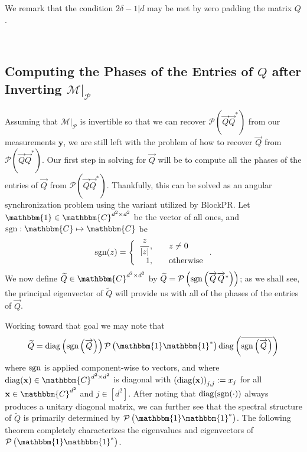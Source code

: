 \documentclass[]{spie}  %
\def \vec{\overrightarrow}
\def \x {\mathbf x}
\def \y {\mathbf y}
\def \one { \mathbbm{1}}
\def \sgn {{\rm sgn}}
\def \diag {{\rm diag}}
\begin{document}
We remark that the condition $2 \delta - 1 \vert d$ may be met by zero padding the matrix $Q$.

\

\subsection{Computing the Phases of the Entries of $Q$ after Inverting $\mathcal{M} \big|_{\mathcal{P}}$}
\label{sec:Getphases}

Assuming that $\mathcal{M} \big|_{\mathcal{P}}$ is invertible so that we can recover $\mathcal{P} ( \vec{Q} \vec{Q}^* )$ from our measurements $\y$, we are still left with the problem of how to recover $\vec{Q}$ from $\mathcal{P} ( \vec{Q} \vec{Q}^* )$.  Our first step in solving for $\vec{Q}$ will be to compute all the phases of the entries of $\vec{Q}$ from $\mathcal{P} ( \vec{Q} \vec{Q}^* )$.  Thankfully, this can be solved as an angular synchronization problem\cite{singer2011angular} using the variant utilized by BlockPR.\cite{viswanathana2015fast,iwen2016phase}  Let $\one \in \mathbbm{C}^{d^2 \times d^2}$ be the vector of all ones, and $\sgn: \mathbbm{C} \mapsto  \mathbbm{C}$ be 
$$\sgn(z) = \left\{\begin{array}{r@{,\qquad}l} \dfrac{z}{|z|} & z \neq 0 \\ 1 & \text{otherwise} \end{array}\right..$$
We now define $\widetilde{Q} \in \mathbbm{C}^{d^2 \times d^2}$ by $\widetilde{Q} = \mathcal{P}\left(\sgn\left(\vec{Q} \vec{Q}^*\right)\right)$; %
as we shall see, the principal eigenvector of $\widetilde{Q}$ will provide us with all of the phases of the entries of $\vec{Q}$.

Working toward that goal we may note that
\begin{equation}
\widetilde{Q} = \diag \left( \sgn \left( \vec{Q} \right) \right) \mathcal{P} \left( \one \one^* \right) \diag \left( \overline{\sgn \left( \vec{Q} \right)} \right)
\label{equ:Qtilde_partial_factor}
\end{equation}
where $\sgn$ is applied component-wise to vectors, and where $\diag(\x)  \in \mathbbm{C}^{d^2 \times d^2}$ is diagonal with $\left(\diag(\x)\right)_{j,j} := x_j$ for all $\x \in \mathbbm{C}^{d^2}$ and $j \in [d^2]$.  After noting that $\diag(\sgn(\cdot))$ always produces a unitary diagonal matrix, we can further see that the spectral structure of $\widetilde{Q}$ is primarily  determined by $\mathcal{P} \left( \one \one^* \right)$.  The following theorem completely characterizes the eigenvalues and eigenvectors of $\mathcal{P} \left( \one \one^* \right)$.
\end{document}
